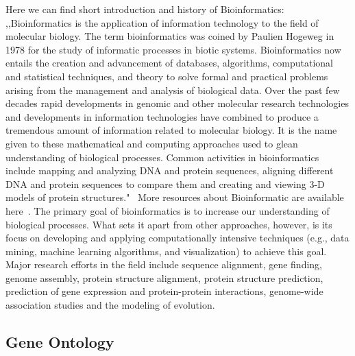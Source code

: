 Here we can find short introduction and history of Bioinformatics: ,,Bioinformatics is the application of information technology to the field of molecular biology. The term bioinformatics was coined by Paulien Hogeweg in 1978 for the study of informatic processes in biotic systems. Bioinformatics now entails the creation and advancement of databases, algorithms, computational and statistical techniques, and theory to solve formal and practical problems arising from the management and analysis of biological data. Over the past few decades rapid developments in genomic and other molecular research technologies and developments in information technologies have combined to produce a tremendous amount of information related to molecular biology. It is the name given to these mathematical and computing approaches used to glean understanding of biological processes. Common activities in bioinformatics include mapping and analyzing DNA and protein sequences, aligning different DNA and protein sequences to compare them and creating and viewing 3-D models of protein structures."~\cite{Bioinformatic} More resources about Bioinformatic are available here~\cite{Bioinformatic_2}.
The primary goal of bioinformatics is to increase our understanding of biological processes. What sets it apart from other approaches, however, is its focus on developing and applying computationally intensive techniques (e.g., data mining, machine learning algorithms, and visualization) to achieve this goal. Major research efforts in the field include sequence alignment, gene finding, genome assembly, protein structure alignment, protein structure prediction, prediction of gene expression and protein-protein interactions, genome-wide association studies and the modeling of evolution.

\subsection{Gene Ontology}
\label{sec:gene_ontology}

